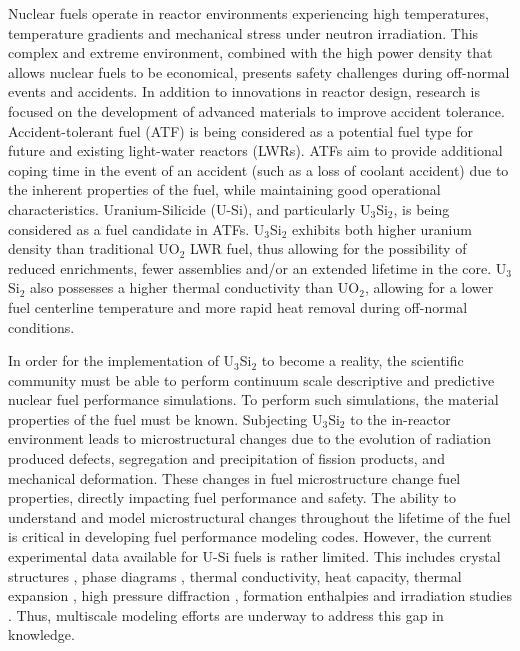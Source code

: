 \documentclass[review]{elsarticle}
\begin{document}
Nuclear fuels operate in reactor environments experiencing high temperatures, temperature gradients and mechanical stress under neutron irradiation.  This complex and extreme environment, combined with the high power density that allows nuclear fuels to be economical, presents safety challenges during off-normal events and accidents.  In addition to innovations in reactor design, research is focused on the development of advanced materials \cite{zinkle2016} to improve accident tolerance.  Accident-tolerant fuel (ATF) \cite{zinkle2014} is being considered as a potential fuel type for future and existing light-water reactors (LWRs).  ATFs aim to provide additional coping time in the event of an accident (such as a loss of coolant accident) due to the inherent properties of the fuel, while maintaining good operational characteristics.  Uranium-Silicide (U-Si), and particularly U$_{3}$Si$_{2}$, is being considered as a fuel candidate in ATFs.  U$_{3}$Si$_{2}$ exhibits both higher uranium density than traditional UO$_{2}$ LWR fuel, thus allowing for the possibility of reduced enrichments, fewer assemblies and/or an extended lifetime in the core.  U$_{3}$Si$_{2}$ also possesses a higher thermal conductivity than UO$_{2}$, allowing for a lower fuel centerline temperature and more rapid heat removal during off-normal conditions.  

In order for the implementation of U$_{3}$Si$_{2}$ to become a reality, the scientific community must be able to perform continuum scale descriptive and predictive nuclear fuel performance simulations.  To perform such simulations, the material properties of the fuel must be known.  Subjecting U$_{3}$Si$_{2}$ to the in-reactor environment leads to microstructural changes due to the evolution of radiation produced defects, segregation and precipitation of fission products, and mechanical deformation. These changes in fuel microstructure change fuel properties, directly impacting fuel performance and safety.  The ability to understand and model microstructural changes throughout the lifetime of the fuel is critical in developing fuel performance modeling codes.  However, the current experimental data available for U-Si fuels is rather limited.   This includes crystal structures \cite{zachariasen1949, remschnig1992}, phase diagrams \cite{massalski1990}, thermal conductivity, heat capacity, thermal expansion \cite{white2015, shimizu1965}, high pressure diffraction \cite{yagoubi2013}, formation enthalpies \cite{gross1962, ohare1975, alcock1962, rand1963, berche2009} and irradiation studies \cite{shimizu1965, finlay2002}.  Thus, multiscale modeling efforts are underway to address this gap in knowledge.
\end{document}
